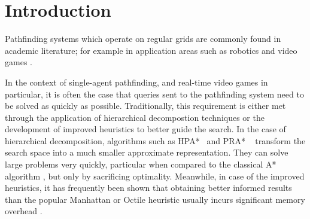\section{Introduction}
Pathfinding systems which operate on regular grids are commonly found in
academic literature; for example in application areas such as robotics 
\cite{choset05} and video games \cite{botea04,sturtevant05,bjornsson06}.
\par
In the context of single-agent pathfinding, and real-time video games in particular, 
it is often the case that queries sent to the pathfinding system  need to be solved as quickly as possible.
Traditionally, this requirement is either met through the application of hierarchical
decompostion techniques or the development of improved heuristics to better guide the search.
In the case of hierarchical decomposition, algorithms such as HPA*~\cite{botea04} and PRA*
~\cite{sturtevant05} transform the search space into a much
smaller approximate representation. They can solve large problems very quickly,
particular when compared to the classical A* algorithm \cite{hart68}, but only by sacrificing optimality.
Meanwhile, in case of the improved heuristics, it has frequently been shown
that obtaining better informed results than the popular
Manhattan or Octile heuristic usually incurs significant memory overhead \cite{sturtevant09,goldberg05,Cazenave:06}. %
%
\par
